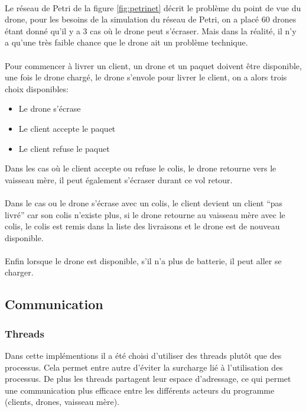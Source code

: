 \documentclass[article, backcover, french, nodocumentinfo]{upmethodology-document}
\begin{document}
			\paragraph*{}
				Le réseau de Petri de la figure \ref{fig:petrinet} décrit le problème du point de vue du drone, pour les besoins de la
				simulation du réseau de Petri, on a placé 60 drones étant donné qu'il y a 3
				cas où le drone peut s'écraser. Mais dans la réalité, il n'y a qu'une très
				faible chance que le drone ait un problème technique.
			\paragraph*{}
				Pour commencer à livrer un client, un drone et un paquet doivent être
				disponible, une fois le drone chargé, le drone s'envole pour livrer le
				client, on a alors trois choix disponibles:
				\begin{itemize}
					\item Le drone s'écrase
					\item Le client accepte le paquet
					\item Le client refuse le paquet
				\end{itemize}
				Dans les cas où le client accepte ou refuse le colis, le drone retourne vers le vaisseau mère,
				il peut également s'écraser	durant ce vol retour.
			\paragraph*{}
				Dans le cas ou le drone s'écrase avec un colis, le client
				devient un client ``pas livré'' car son colis n'existe plus, si le drone
				retourne au vaisseau mère avec le colis, le colis est remis dans la liste
				des livraisons et le drone est de nouveau disponible.
			\paragraph*{}
				Enfin lorsque le drone est disponible, s'il n'a plus de batterie, il peut
				aller se charger.
		\subsection{Communication}
			\subsubsection{Threads}
				Dans cette implémentions il a été choisi d'utiliser des threads plutôt que des processus.
				Cela permet entre autre d'éviter la surcharge lié à l'utilisation des processus.
				De plus les threads partagent leur espace d'adressage, ce qui permet une communication
				plus efficace entre les différents acteurs du programme (clients, drones, vaisseau mère).
\end{document}
